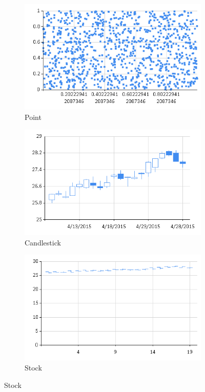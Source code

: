\begin{figure}[htb]
	\begin{subfigure}[b]{.30\linewidth}
		\centering
		\includegraphics[width=1\linewidth]{images/charting-point.png}
		\caption{Point}
	\end{subfigure}
	\begin{subfigure}[b]{.30\linewidth}
		\centering
		\includegraphics[width=1\linewidth]{images/charting-candlestick.png}
		\caption{Candlestick}
	\end{subfigure}
	\begin{subfigure}[b]{.30\linewidth}
		\centering
		\includegraphics[width=1\linewidth]{images/charting-stock.png}
		\caption{Stock}
	\end{subfigure}


\end{figure}
